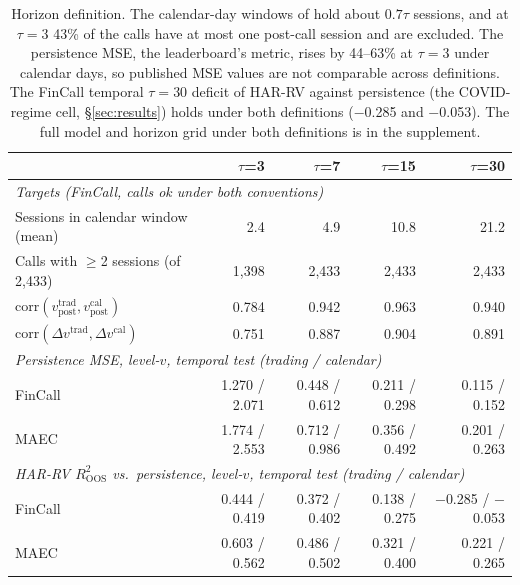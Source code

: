 \begin{table}[t]
\centering
\small
\begin{tabular}{lrrrr}
\toprule
 & $\tau$=3 & $\tau$=7 & $\tau$=15 & $\tau$=30 \\
\midrule
\multicolumn{5}{l}{\textit{Targets (FinCall, calls ok under both conventions)}}\\
Sessions in calendar window (mean)  & 2.4 & 4.9 & 10.8 & 21.2 \\
Calls with $\ge$2 sessions (of 2{,}433) & 1{,}398 & 2{,}433 & 2{,}433 & 2{,}433 \\
corr$(v_{\mathrm{post}}^{\mathrm{trad}}, v_{\mathrm{post}}^{\mathrm{cal}})$ & 0.784 & 0.942 & 0.963 & 0.940 \\
corr$(\Delta v^{\mathrm{trad}}, \Delta v^{\mathrm{cal}})$ & 0.751 & 0.887 & 0.904 & 0.891 \\
\midrule
\multicolumn{5}{l}{\textit{Persistence MSE, level-$v$, temporal test (trading / calendar)}}\\
FinCall & 1.270 / 2.071 & 0.448 / 0.612 & 0.211 / 0.298 & 0.115 / 0.152 \\
MAEC    & 1.774 / 2.553 & 0.712 / 0.986 & 0.356 / 0.492 & 0.201 / 0.263 \\
\midrule
\multicolumn{5}{l}{\textit{HAR-RV $R^2_{\mathrm{OOS}}$ vs.\ persistence, level-$v$, temporal test (trading / calendar)}}\\
FinCall & 0.444 / 0.419 & 0.372 / 0.402 & 0.138 / 0.275 & $-$0.285 / $-$0.053 \\
MAEC    & 0.603 / 0.562 & 0.486 / 0.502 & 0.321 / 0.400 & 0.221 / 0.265 \\
\bottomrule
\end{tabular}
\caption{Horizon definition. The calendar-day windows of \citet{qin2019what}
hold about $0.7\tau$ sessions, and at $\tau{=}3$ 43\% of the calls have at most one
post-call session and are excluded. The persistence MSE, the leaderboard's metric,
rises by 44--63\% at $\tau{=}3$ under calendar days, so published MSE values are not
comparable across definitions. The FinCall temporal $\tau{=}30$ deficit of HAR-RV
against persistence (the COVID-regime cell, \S\ref{sec:results}) holds under both
definitions ($-$0.285 and $-$0.053). The full model and horizon grid under both
definitions is in the supplement.}
\label{tab:convention}
\end{table}
